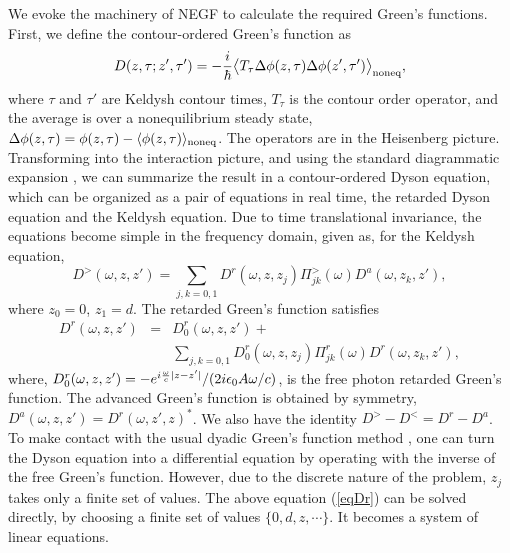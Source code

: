 \documentclass[doublecol]{epl2}
\begin{document}
We evoke the machinery of NEGF \cite{haug96,wang08review,wang14rev,aeberhard12} to calculate the required Green's functions.  First, we define the contour-ordered Green's function as
\begin{equation}
D(z,\tau;z',\tau') = -\frac{i}{\hbar} \bigl\langle T_{\tau} \Delta \phi(z,\tau) \Delta \phi(z',\tau') \bigr\rangle_{\rm noneq},
\end{equation}
where $\tau$ and $\tau'$ are Keldysh contour times, $T_{\tau}$ is the contour order operator, and the average is over a nonequilibrium steady state, $\Delta \phi(z,\tau) = \phi(z,\tau) - \langle \phi(z,\tau) \rangle_{\rm noneq}$.
The operators are in the Heisenberg picture.  Transforming into the interaction picture, and using the standard diagrammatic expansion \cite{bruus04}, we can summarize the result in a 
contour-ordered Dyson equation, which can be organized as a pair of equations in real time, the retarded Dyson equation and the Keldysh equation. 
Due to time translational invariance, the equations become simple in the frequency domain, given as, for the Keldysh equation, 
\begin{equation}
D^>(\omega, z,z') =\!\!\! \sum_{j,k=0,1}\!\!\! D^r(\omega, z,z_j) \Pi^>_{jk}(\omega) D^a (\omega,z_k,z')
,
\end{equation}
where $z_0 = 0$, $z_1 = d$. The retarded Green's function satisfies
\begin{eqnarray}
D^{r}(\omega, z,z') &=& D_0^{r}(\omega, z,z') +\nonumber \\
&&\!\!\!\!\!\!  \sum_{j,k=0,1}\!\!\! D_0^r(\omega, z, z_j) \Pi^{r}_{jk}(\omega)
D^{r}(\omega, z_k,z'),
\label{eqDr}
\end{eqnarray}
where, $D_0^r(\omega, z,z') = - e^{i{\omega\over c}|z-z'|}/(2i \epsilon_0 A \omega/c)$,  is the free photon retarded Green's function.  The advanced Green's function is obtained
by symmetry, $D^{a}(\omega,z,z') = D^{r}(\omega,z',z)^{*}$. We also have the identity 
$D^{>}-D^{<} = D^{r} - D^{a}$. 
To make contact with the usual dyadic Green's function method \cite{Song-rev15}, one can 
turn the Dyson equation into a differential equation by operating with the
inverse of the free Green's function. However, 
due to the discrete nature of the problem, $z_j$ takes only a finite set of values. 
The above equation (\ref{eqDr}) can be solved directly, by choosing a finite
set of values $\{0,d,z,\cdots\}$.  It becomes a system of linear equations.  
\end{document}
